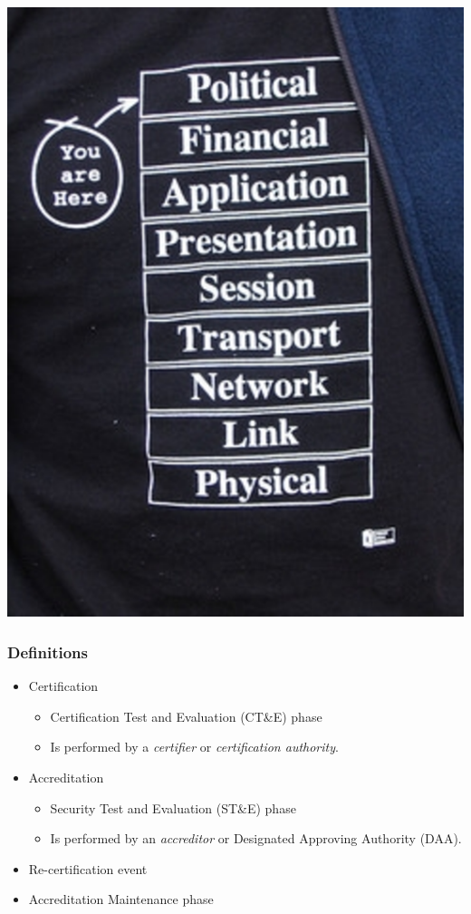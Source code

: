 \documentclass{beamer}
\begin{document}
\begin{frame}
	\begin{center}
		\includegraphics{ISO-9-layer-model-smaller.eps}
	\end{center}
\end{frame}

\begin{frame}
	\frametitle{Definitions}
	\begin{itemize}
		\item Certification
			\begin{itemize}
				\item Certification Test and Evaluation (CT\&E) phase
				\item Is performed by a \emph{certifier} or \emph{certification authority}.
			\end{itemize}
		\item Accreditation
			\begin{itemize}
				\item Security Test and Evaluation (ST\&E) phase
				\item Is performed by an \emph{accreditor} or Designated Approving Authority
					(DAA).
			\end{itemize}
		\item Re-certification event
		\item Accreditation Maintenance phase
	\end{itemize}
\end{frame}
\end{document}
